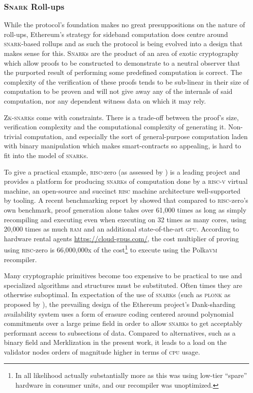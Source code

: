 \subsubsection{\textsc{Snark} Roll-ups}

While the protocol's foundation makes no great presuppositions on the nature of roll-ups, Ethereum's strategy for sideband computation does centre around \textsc{snark}-based rollups and as such the protocol is being evolved into a design that makes sense for this. \textsc{Snark}s are the product of an area of exotic cryptography which allow proofs to be constructed to demonstrate to a neutral observer that the purported result of performing some predefined computation is correct. The complexity of the verification of these proofs tends to be sub-linear in their size of computation to be proven and will not give away any of the internals of said computation, nor any dependent witness data on which it may rely.

\textsc{Zk-snark}s come with constraints. There is a trade-off between the proof's size, verification complexity and the computational complexity of generating it. Non-trivial computation, and especially the sort of general-purpose computation laden with binary manipulation which makes smart-contracts so appealing, is hard to fit into the model of \textsc{snark}s.

To give a practical example, \textsc{risc}-zero (as assessed by \cite{bogli2024assessing}) is a leading project and provides a platform for producing \textsc{snark}s of computation done by a \textsc{risc-v} virtual machine, an open-source and succinct \textsc{risc} machine architecture well-supported by tooling. A recent benchmarking report by \cite{koute2024risc0} showed that compared to \textsc{risc}-zero's own benchmark, proof generation alone takes over 61,000 times as long as simply recompiling and executing even when executing on 32 times as many cores, using 20,000 times as much \textsc{ram} and an additional state-of-the-art \textsc{gpu}. According to hardware rental agents \url{https://cloud-gpus.com/}, the cost multiplier of proving using \textsc{risc}-zero is 66,000,000x of the cost\footnote{In all likelihood actually substantially more as this was using low-tier ``spare'' hardware in consumer units, and our recompiler was unoptimized.} to execute using the Polka\textsc{vm} recompiler.

Many cryptographic primitives become too expensive to be practical to use and specialized algorithms and structures must be substituted. Often times they are otherwise suboptimal. In expectation of the use of \textsc{snark}s (such as \textsc{plonk} as proposed by \cite{cryptoeprint:2019/953}), the prevailing design of the Ethereum project's Dank-sharding availability system uses a form of erasure coding centered around polynomial commitments over a large prime field in order to allow \textsc{snark}s to get acceptably performant access to subsections of data. Compared to alternatives, such as a binary field and Merklization in the present work, it leads to a load on the validator nodes orders of magnitude higher in terms of \textsc{cpu} usage.

